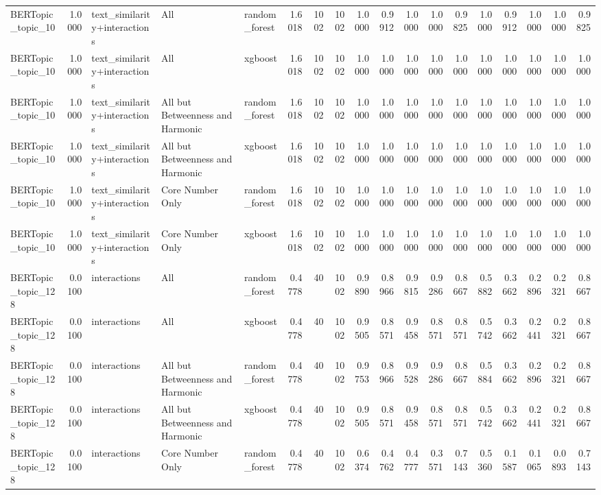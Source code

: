 \begin{tabular}{lrlllrrrrrrrrrrrrr}
BERTopic_topic_10 & 1.0000 & text_similarity+interactions & All & random_forest & 1.6018 & 1002 & 1002 & 1.0000 & 0.9912 & 1.0000 & 1.0000 & 0.9825 & 1.0000 & 0.9912 & 1.0000 & 1.0000 & 0.9825 \\
BERTopic_topic_10 & 1.0000 & text_similarity+interactions & All & xgboost & 1.6018 & 1002 & 1002 & 1.0000 & 1.0000 & 1.0000 & 1.0000 & 1.0000 & 1.0000 & 1.0000 & 1.0000 & 1.0000 & 1.0000 \\
BERTopic_topic_10 & 1.0000 & text_similarity+interactions & All but Betweenness and Harmonic & random_forest & 1.6018 & 1002 & 1002 & 1.0000 & 1.0000 & 1.0000 & 1.0000 & 1.0000 & 1.0000 & 1.0000 & 1.0000 & 1.0000 & 1.0000 \\
BERTopic_topic_10 & 1.0000 & text_similarity+interactions & All but Betweenness and Harmonic & xgboost & 1.6018 & 1002 & 1002 & 1.0000 & 1.0000 & 1.0000 & 1.0000 & 1.0000 & 1.0000 & 1.0000 & 1.0000 & 1.0000 & 1.0000 \\
BERTopic_topic_10 & 1.0000 & text_similarity+interactions & Core Number Only & random_forest & 1.6018 & 1002 & 1002 & 1.0000 & 1.0000 & 1.0000 & 1.0000 & 1.0000 & 1.0000 & 1.0000 & 1.0000 & 1.0000 & 1.0000 \\
BERTopic_topic_10 & 1.0000 & text_similarity+interactions & Core Number Only & xgboost & 1.6018 & 1002 & 1002 & 1.0000 & 1.0000 & 1.0000 & 1.0000 & 1.0000 & 1.0000 & 1.0000 & 1.0000 & 1.0000 & 1.0000 \\
BERTopic_topic_128 & 0.0100 & interactions & All & random_forest & 0.4778 & 40 & 1002 & 0.9890 & 0.8966 & 0.9815 & 0.9286 & 0.8667 & 0.5882 & 0.3662 & 0.2896 & 0.2321 & 0.8667 \\
BERTopic_topic_128 & 0.0100 & interactions & All & xgboost & 0.4778 & 40 & 1002 & 0.9505 & 0.8571 & 0.9458 & 0.8571 & 0.8571 & 0.5742 & 0.3662 & 0.2441 & 0.2321 & 0.8667 \\
BERTopic_topic_128 & 0.0100 & interactions & All but Betweenness and Harmonic & random_forest & 0.4778 & 40 & 1002 & 0.9753 & 0.8966 & 0.9528 & 0.9286 & 0.8667 & 0.5884 & 0.3662 & 0.2896 & 0.2321 & 0.8667 \\
BERTopic_topic_128 & 0.0100 & interactions & All but Betweenness and Harmonic & xgboost & 0.4778 & 40 & 1002 & 0.9505 & 0.8571 & 0.9458 & 0.8571 & 0.8571 & 0.5742 & 0.3662 & 0.2441 & 0.2321 & 0.8667 \\
BERTopic_topic_128 & 0.0100 & interactions & Core Number Only & random_forest & 0.4778 & 40 & 1002 & 0.6374 & 0.4762 & 0.4777 & 0.3571 & 0.7143 & 0.5360 & 0.1587 & 0.1065 & 0.0893 & 0.7143 \\

\end{tabular}
